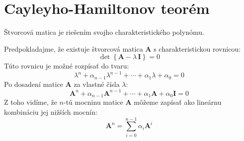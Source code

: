 \documentclass[a4paper, 10pt, ]{article}
\begin{document}
\bigskip

\normalsize
\normalfont



\section{Cayleyho-Hamiltonov teorém}

\begin{theorem}
    Štvorcová matica je riešením svojho charakteristického polynómu.

    \noindent Predpokladajme, že existuje štvorcová matica $\bm{A}$ s charakteristickou rovnicou:
    \begin{equation}
        \det \left\{ \bm{A} - \lambda \, \bm{I} \right\} = 0
    \end{equation}
    Túto rovnicu je možné rozpísať do tvaru:
    \begin{equation}
        \lambda^n + \alpha_{n - 1} \lambda^{n - 1} + \cdots + \alpha_{1} \lambda + \alpha_{0} = 0
    \end{equation}
    Po dosadení matice $\bm{A}$ za vlastné čísla $\lambda$:
    \begin{equation}
        \bm{A}^n + \alpha_{n - 1} \bm{A}^{n - 1} + \cdots + \alpha_{1} \bm{A} + \alpha_{0} \bm{I} = 0
    \end{equation}
    Z toho vidíme, že $n$-tú mocninu matice $\bm{A}$ môžeme zapísať	ako lineárnu kombináciu jej nižších mocnín:
    \begin{equation}
        \bm{A}^n = \sum_{i = 0}^{n - 1} \alpha_{i} \bm{A}^{i}
    \end{equation}
\end{theorem}
\end{document}
